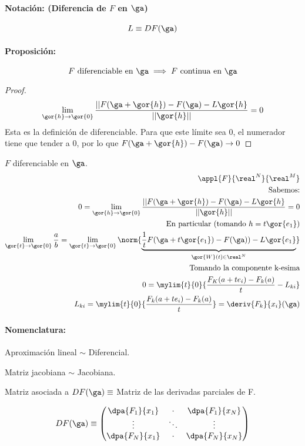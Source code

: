 \documentclass{apuntes}
\begin{document}
\paragraph{Notación: (Diferencia de $F$ en $\ga$)}

$$L\equiv DF(\ga)$$ 

\paragraph{Proposición:}
$$F \text{ diferenciable en } \ga \implies F \text{ continua en } \ga$$
\begin{proof}
 $$\lim_{\gor{h} \rightarrow \gor{0}} \frac{||F(\ga+\gor{h}) - F(\ga) - L\gor{h}}{||\gor{h}||} = 0$$
 Esta es la definición de diferenciable. Para que este límite sea 0, el numerador tiene que tender a 0, por lo que $F(\ga+\gor{h}) - F(\ga) \rightarrow 0$
\end{proof}

\obs
$F$ diferenciable en $\ga$.
\begin{align*}
\appl{F}{\real^N}{\real^M}\\
\text{Sabemos:}\\
 0 = \lim_{\gor{h} \rightarrow \gor{0}} \frac{||F(\ga+\gor{h}) - F(\ga) - L\gor{h}}{||\gor{h}||} = 0 \\
 \text{En particular (tomando } h = t \gor{e_1})\\
 \lim_{\gor{t} \rightarrow \gor{0}}\frac{a}{b} = \lim_{\gor{t} \rightarrow \gor{0}}\norm{\underbrace{\frac{1}{t} F(\ga+t\gor{e_1})-F(\ga))-L\gor{e_1}}_{\gor{W}(t)\in\real^N}}\\
 \text{Tomando la componente k-esima}\\
 0 = \mylim{t}{0}{\frac{F_K(a+te_i)-F_k(a)}{t} - L_{ki}}\\
 L_{ki} = \mylim{t}{0} {\frac{F_k(a+te_i) - F_k(a)}{t}} = \deriv{ F_k}{x_i}(\ga)
\end{align*}

\paragraph{Nomenclatura: }
Aproximación lineal $\sim$ Diferencial.

Matriz jacobiana $\sim$ Jacobiana.

\begin{theorem}
 Matriz asociada a $DF(\ga) \equiv $ Matriz de las derivadas parciales de F.
 
 $$DF(\ga) \equiv \begin{pmatrix}
                \dpa{F_1}{x_1} & \cdot & \dpa{F_1}{x_N}\\
                \vdots& \ddots & \vdots\\
                \dpa{F_N}{x_1} & \cdot & \dpa{F_N}{x_N}
                \end{pmatrix}
$$
\end{theorem}
\end{document}
